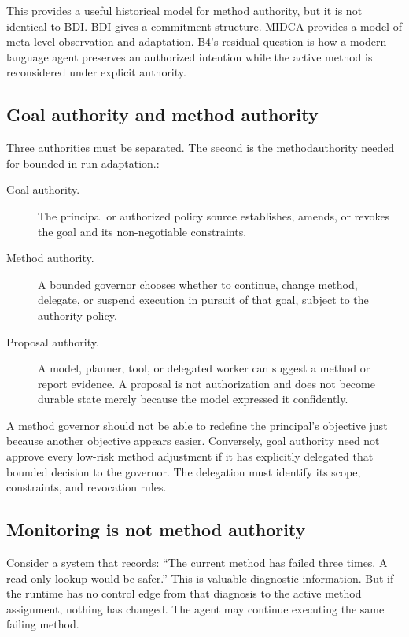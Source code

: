 This provides a useful historical model for method authority, but it is not identical to BDI. BDI gives a commitment structure. MIDCA provides a model of meta-level observation and adaptation. B4's residual question is how a modern language agent preserves an authorized intention while the active method is reconsidered under explicit authority.

\subsection{Goal authority and method authority}

Three authorities must be separated. The second is the \gls{methodauthority} needed for bounded in-run adaptation.:

\begin{description}
  \item[Goal authority.] The principal or authorized policy source establishes, amends, or revokes the goal and its non-negotiable constraints.
  \item[Method authority.] A bounded governor chooses whether to continue, change method, delegate, or suspend execution in pursuit of that goal, subject to the authority policy.
  \item[Proposal authority.] A model, planner, tool, or delegated worker can suggest a method or report evidence. A proposal is not authorization and does not become durable state merely because the model expressed it confidently.
\end{description}

A method governor should not be able to redefine the principal's objective just because another objective appears easier. Conversely, goal authority need not approve every low-risk method adjustment if it has explicitly delegated that bounded decision to the governor. The delegation must identify its scope, constraints, and revocation rules.

\subsection{Monitoring is not method authority}

Consider a system that records: ``The current method has failed three times. A read-only lookup would be safer.'' This is valuable diagnostic information. But if the runtime has no control edge from that diagnosis to the active method assignment, nothing has changed. The agent may continue executing the same failing method.

